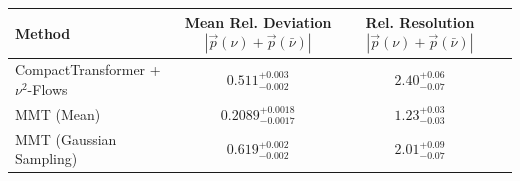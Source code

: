     \begin{tabular}{lccc}
        \toprule
        Method & Mean Rel. Deviation $|\vec{p}(\nu) + \vec{p}(\bar{\nu})|$ & Rel. Resolution $|\vec{p}(\nu) + \vec{p}(\bar{\nu})|$ \\
        \midrule
        CompactTransformer + $\nu^2$-Flows & $0.511^{+0.003}_{-0.002}$ & $2.40^{+0.06}_{-0.07}$ \\
        MMT (Mean) & $0.2089^{+0.0018}_{-0.0017}$ & $1.23^{+0.03}_{-0.03}$ \\
        MMT (Gaussian Sampling) & $0.619^{+0.002}_{-0.002}$ & $2.01^{+0.09}_{-0.07}$ \\
        \bottomrule
    \end{tabular}